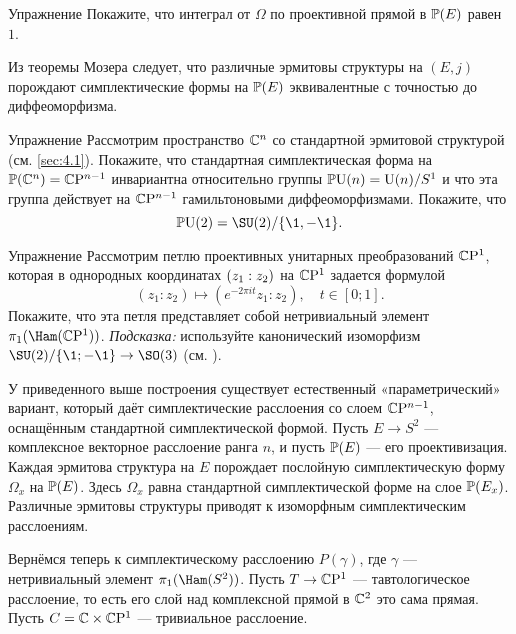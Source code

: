 \begin{ex}{Упражнение}\label{9.2.A}
  Покажите, что интеграл от $\Omega$ по проективной прямой в $\mathbb{P}(E)$
  равен $1$.
\end{ex}

Из теоремы Мозера \cite{MS} следует, что различные эрмитовы структуры
на $(E, j)$ порождают симплектические формы на
$\mathbb{P}(E)$ эквивалентные с точностью до диффеоморфизма. 

\begin{ex}{Упражнение}\label{9.2.B}
  Рассмотрим пространство $\mathbb{C}^n$ со стандартной эрмитовой структурой
  (см. \ref{sec:4.1}).
  Покажите, что стандартная симплектическая форма на $\mathbb{P}(\mathbb{C}^n ) =
  \mathbb{C}\mathrm{P}^{n-1}$ инвариантна относительно группы $\mathbb{P}\mathrm{U} (n) = \mathrm{U} (n)/S^1$ и
  что эта группа действует на $\mathbb{C}\mathrm{P}^{n-1}$ гамильтоновыми
  диффеоморфизмами.
  Покажите, что 
  \[\PU (2) = \SU (2)/\{\1, -\1\}.\]
\end{ex}
 
\begin{ex}{Упражнение}\label{9.2.C}
  Рассмотрим петлю проективных унитарных преобразований $\mathbb{C}\mathrm{P}^1$,
  которая в однородных координатах $(z_1 \z: z_2)$ на $\mathbb{C}\mathrm{P}^1$ задается формулой
  \[(z_1 : z_2 ) \mapsto (e^{-2\pi it} z_1 : z_2 ),\quad t \in [0; 1].\]
  Покажите, что эта петля представляет собой нетривиальный элемент
  $\pi_1 (\Ham(\CP^1 ))$.
  \emph{Подсказка:} используйте канонический изоморфизм
  $\SU (2)/\{\1; -\1\}\to \SO(3)$ (см. \cite{DFN}).  
\end{ex}

У приведенного выше построения существует естественный
«параметрический» вариант, который даёт симплектические расслоения со
слоем $\mathbb{C}\mathrm{P}^{n-1}$, оснащённым стандартной симплектической формой. 
Пусть $E \to S^2$ — комплексное векторное расслоение ранга $n$, и
пусть $\mathbb{P}(E)$ — его проективизация. 
Каждая эрмитова структура на $E$ порождает послойную симплектическую
форму $\Omega_x$ на $\mathbb{P}(E)$. 
Здесь $\Omega_x$ равна стандартной симплектической форме на слое
$\mathbb{P}(E_x)$.
Различные эрмитовы структуры приводят к изоморфным симплектическим
расслоениям. 

Вернёмся теперь к симплектическому расслоению $P(\gamma)$, где
$\gamma$ — нетривиальный элемент $\pi_1 (\Ham(S^2 ))$. 
Пусть $T \to \mathbb{C}\mathrm{P}^1$ — тавтологическое расслоение,
то есть его слой над комплексной прямой в $\mathbb{C}^2$ это сама прямая. 
Пусть $C = \mathbb{C} \times \mathbb{C}\mathrm{P}^1$ — тривиальное расслоение.
 
